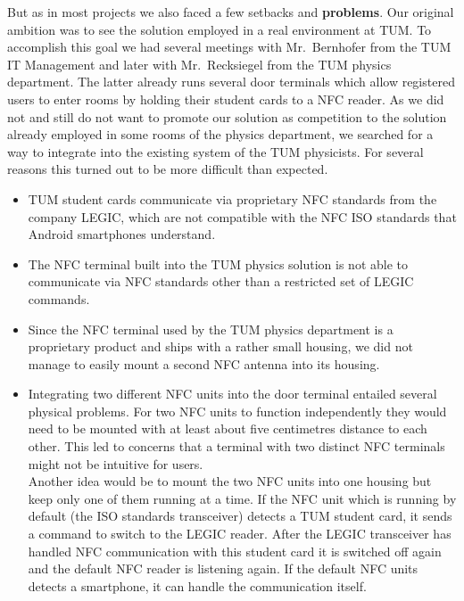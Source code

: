 But as in most projects we also faced a few setbacks and \textbf{problems}.
Our original ambition was to see the \app solution employed in a real environment at TUM.
To accomplish this goal we had several meetings with Mr.~Bernhofer from the TUM IT Management and later with Mr.~Recksiegel from the TUM physics department.
The latter already runs several door terminals which allow registered users to enter rooms by holding their student cards to a NFC reader.
As we did not and still do not want to promote our solution as competition to the solution already employed in some rooms of the physics department, we searched for a way to integrate \app into the existing system of the TUM physicists.
For several reasons this turned out to be more difficult than expected.
\begin{itemize}
\item TUM student cards communicate via proprietary NFC standards from the company LEGIC, which are not compatible with the NFC ISO standards that Android smartphones understand.
\item The NFC terminal built into the TUM physics solution is not able to communicate via NFC standards other than a restricted set of LEGIC commands.
\item Since the NFC terminal used by the TUM physics department is a proprietary product and ships with a rather small housing, we did not manage to easily mount a second NFC antenna into its housing.
\item Integrating two different NFC units into the door terminal entailed several physical problems.
For two NFC units to function independently they would need to be mounted with at least about five centimetres distance to each other.
This led to concerns that a terminal with two distinct NFC terminals might not be intuitive for users.\\
Another idea would be to mount the two NFC units into one housing but keep only one of them running at a time.
If the NFC unit which is running by default (the ISO standards transceiver) detects a TUM student card, it sends a command to switch to the LEGIC reader.
After the LEGIC transceiver has handled NFC communication with this student card it is switched off again and the default NFC reader is listening again.
If the default NFC units detects a smartphone, it can handle the communication itself.
\end{itemize}


